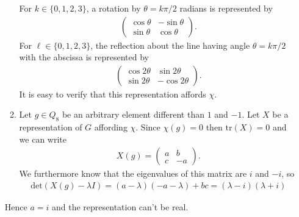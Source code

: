 \documentclass[11pt]{article} \usepackage{amssymb}
\newcommand{\de}{\mathrm{det}}
\begin{document}
\begin{enumerate}
\begin{enumerate}
    For $k \in \{0,1,2,3\}$, a rotation by $\theta = k\pi/2$ radians is
    represented by
    \begin{align*}
      \begin{pmatrix}
        \cos\theta&-\sin\theta\\
        \sin\theta&\cos\theta
      \end{pmatrix}.
    \end{align*}
    For $\ell \in \{0,1,2,3\}$, the reflection about the line having
    angle $\theta=k\pi/2$ with the abscissa is represented by
    \begin{align*}
      \begin{pmatrix}
        \cos2\theta&\sin2\theta\\
        \sin2\theta&-\cos2\theta
      \end{pmatrix}.
    \end{align*}
    It is easy to verify that this representation affords $\chi$.
  \item Let $g \in Q_8$ be an arbitrary element different than $1$ and
    $-1$. Let $X$ be a representation of $G$ affording $\chi$.  Since
    $\chi(g)=0$ then $\mathrm{tr}(X)=0$ and we can write
    \begin{align*}
      X(g) =
      \begin{pmatrix}
        a&b\\
        c&-a
      \end{pmatrix}.
    \end{align*}
    We furthermore know that the eigenvalues of this matrix are $i$
    and $-i$, so
    \begin{align*}
      \de(X(g)-\lambda I) = (a-\lambda)(-a-\lambda)+bc =
      (\lambda-i)(\lambda+i)
    \end{align*}
  \end{enumerate}
  Hence $a=i$ and the representation can't be real.
\end{enumerate}
\end{document}
